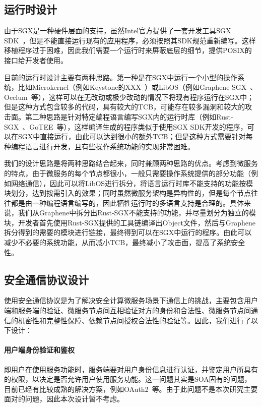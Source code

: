 \subsection{运行时设计}

由于SGX是一种硬件层面的支持，虽然Intel官方提供了一套开发工具SGX SDK~\cite{}，但是不能直接运行现有的应用程序，必须按照其SDK规范重新编写。这样移植程序过于困难，因此我们需要一个运行时来屏蔽底层的细节，提供POSIX的接口给开发者使用。

目前的运行时设计主要有两种思路。第一种是在SGX中运行一个小型的操作系统，比如Microkernel（例如Keystone的XXX~\cite{}）或LibOS（例如Graphene-SGX~\cite{}、Occlum~\cite{}等），这样可以在无改动或极少改动的情况下将现有程序运行在SGX中；但是这种方式包含较多的代码，具有较大的TCB，可能存在较多漏洞和较大的攻击面。第二种思路是针对特定编程语言编写SGX内的运行时库（例如Rust-SGX~\cite{}、GoTEE~\cite{}等），这样编译生成的程序类似于使用SGX SDK开发的程序，可以在SGX中直接运行，由此可以达到很小的额外TCB；但是这种方式需要针对每种编程语言进行开发，且有些操作系统功能的实现非常困难。

我们的设计思路是将两种思路结合起来，同时兼顾两种思路的优点。考虑到微服务的特点，由于微服务的每个节点都很小，一般只需要操作系统提供的部分功能（例如网络通信），因此可以将LibOS进行拆分，将语言运行时库不能支持的功能按模块划分，达到按需引入的效果；同时虽然微服务架构是异构性的，但是每个节点往往都是由一种编程语言编写的，因此牺牲运行时的多语言支持是合理的。具体来说，我们从Graphene中拆分出Rust-SGX不能支持的功能，并尽量划分为独立的模块，开发者首先使用Rust-SGX提供的工具链编译出Object文件，然后与Graphene拆分得到的需要的模块进行链接，最终得到可以在SGX中运行的程序。由此可以减少不必要的系统功能，从而减小TCB，最终减小了攻击面，提高了系统安全性。

\subsection{安全通信协议设计}

使用安全通信协议是为了解决安全计算微服务场景下通信上的挑战，主要包含用户端和服务端的验证、微服务节点间互相验证对方的身份和合法性、微服务节点间通信的机密性和完整性保障、依赖节点间授权合法性的验证等。因此，我们进行了以下设计：

\paragraph{用户端身份验证和鉴权}
即用户在使用服务功能时，服务端要对用户身份信息进行认证，并鉴定用户所具有的权限，以决定是否允许用户使用服务功能。这一问题其实是SOA固有的问题，目前已经有比较成熟的解决方案，例如OAuth2~\cite{}等。由于此问题不是本次研究主要面对的问题，因此本次设计暂不考虑。

